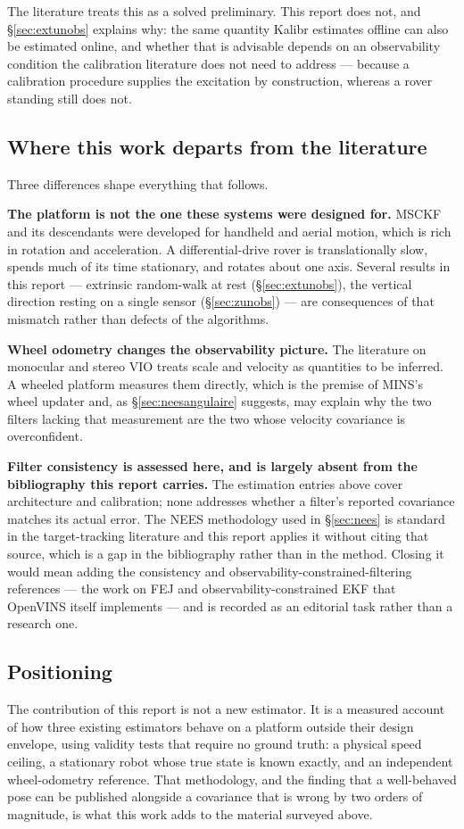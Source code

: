 The literature treats this as a solved preliminary. This report does not,
and \S\ref{sec:extunobs} explains why: the same quantity Kalibr estimates
offline can also be estimated online, and whether that is advisable depends
on an observability condition the calibration literature does not need to
address --- because a calibration procedure supplies the excitation by
construction, whereas a rover standing still does not.

\subsection{Where this work departs from the literature}

Three differences shape everything that follows.

\textbf{The platform is not the one these systems were designed for.} MSCKF
and its descendants were developed for handheld and aerial motion, which is
rich in rotation and acceleration. A differential-drive rover is
translationally slow, spends much of its time stationary, and rotates about
one axis. Several results in this report --- extrinsic random-walk at rest
(\S\ref{sec:extunobs}), the vertical direction resting on a single sensor
(\S\ref{sec:zunobs}) --- are consequences of that mismatch rather than
defects of the algorithms.

\textbf{Wheel odometry changes the observability picture.} The literature on
monocular and stereo VIO treats scale and velocity as quantities to be
inferred. A wheeled platform measures them directly, which is the premise
of MINS's wheel updater and, as \S\ref{sec:neesangulaire} suggests, may
explain why the two filters lacking that measurement are the two whose
velocity covariance is overconfident.

\textbf{Filter consistency is assessed here, and is largely absent from the
bibliography this report carries.} The estimation entries above cover
architecture and calibration; none addresses whether a filter's reported
covariance matches its actual error. The NEES methodology used in
\S\ref{sec:nees} is standard in the target-tracking literature and this
report applies it without citing that source, which is a gap in the
bibliography rather than in the method. Closing it would mean adding the
consistency and observability-constrained-filtering references --- the
work on FEJ and observability-constrained EKF that OpenVINS itself
implements --- and is recorded as an editorial task rather than a research
one.

\subsection{Positioning}

The contribution of this report is not a new estimator. It is a measured
account of how three existing estimators behave on a platform outside their
design envelope, using validity tests that require no ground truth: a
physical speed ceiling, a stationary robot whose true state is known
exactly, and an independent wheel-odometry reference. That methodology, and
the finding that a well-behaved pose can be published alongside a covariance
that is wrong by two orders of magnitude, is what this work adds to the
material surveyed above.
